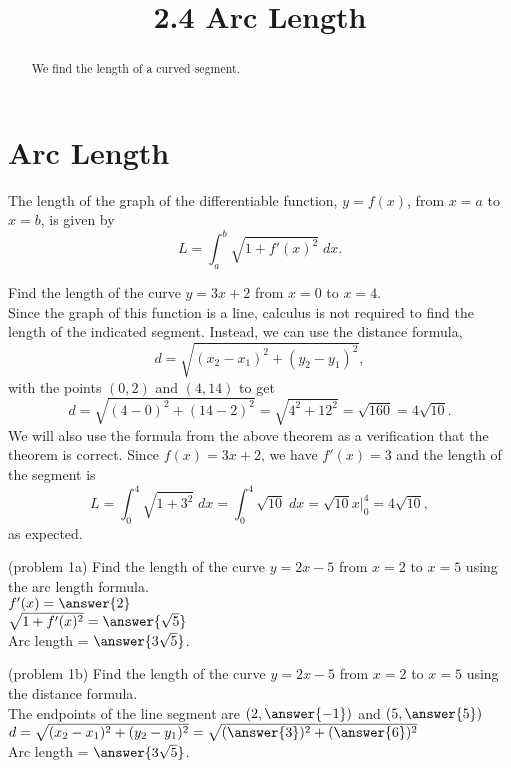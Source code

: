 \documentclass[handout]{ximera}
\title{2.4 Arc Length}
\begin{document}
\begin{abstract}
We find the length of a curved segment.
\end{abstract}

\maketitle

\section{Arc Length}

\begin{theorem} The length of the graph of the differentiable function, $y = f(x)$, from $x = a$ to $x = b$, is given by
\[
L = \int_a^b \sqrt{1+ f'(x)^2} \; dx.
\]
\end{theorem}

\begin{example}[example 1]
Find the length of the curve $y = 3x + 2$ from $x = 0$ to $x = 4$. \\
Since the graph of this function is a line, calculus is not required to find the length of the indicated segment.
Instead, we can use the distance formula, 
\[
d = \sqrt{(x_2 - x_1)^2 + (y_2-y_1)^2},
\]
 with the points $(0,2)$ and $(4, 14)$
to get 
\[
d = \sqrt{(4-0)^2 + (14-2)^2} = \sqrt{4^2 + 12^2} = \sqrt{160} = 4\sqrt{10}.
\]
We will also use the formula from the above theorem as a verification that the theorem is correct.
Since $f(x) = 3x+2$, we have $f'(x) = 3$ and the length of the segment is
\[
L = \int_0^4 \sqrt{1 + 3^2} \;dx = \int_0^4 \sqrt{10} \; dx = \sqrt{10}x\bigg|_0^4 = 4\sqrt{10},
\]
as expected.
\end{example}



\begin{problem}(problem 1a)
Find the length of the curve $ y = 2x - 5$ from $x = 2$ to $x = 5$ using the arc length formula.\\

$f'(x) = \answer{2}$\\

$\sqrt{1+f'(x)^2} = \answer{\sqrt{5}}$\\

Arc length = $\answer{3\sqrt{5}}$.
\end{problem}



\begin{problem}(problem 1b)
Find the length of the curve $y = 2x - 5$ from $x = 2$ to $x = 5$ using the distance formula.\\

The endpoints of the line segment are $(2, \answer{-1})$ and $(5, \answer{5})$\\

$d = \sqrt{(x_2 - x_1)^2 + (y_2 - y_1)^2} = \sqrt{(\answer{3})^2 + (\answer{6})^2}$\\

Arc length = $\answer{3\sqrt{5}}$.
\end{problem}
\end{document}

